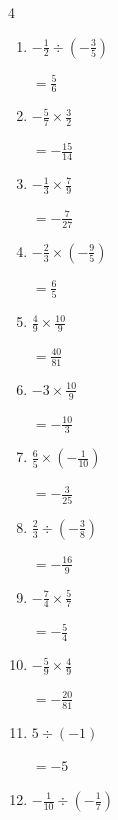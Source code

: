 \begin{multicols}{4}
\begin{enumerate}
        $\displaystyle =\frac{21}{2}$

  \item $\displaystyle -\frac{1}{2}\div{}\left(-\frac{3}{5}\right)$

        $\displaystyle =\frac{5}{6}$

  \item $\displaystyle -\frac{5}{7}\times{}\frac{3}{2}$

        $\displaystyle =-\frac{15}{14}$

\columnbreak %

  \item $\displaystyle -\frac{1}{3}\times{}\frac{7}{9}$

        $\displaystyle =-\frac{7}{27}$

  \item $\displaystyle -\frac{2}{3}\times{}\left(-\frac{9}{5}\right)$

        $\displaystyle =\frac{6}{5}$

  \item $\displaystyle \frac{4}{9}\times{}\frac{10}{9}$

        $\displaystyle =\frac{40}{81}$

  \item $\displaystyle -3\times{}\frac{10}{9}$

        $\displaystyle =-\frac{10}{3}$

  \item $\displaystyle \frac{6}{5}\times{}\left(-\frac{1}{10}\right)$

        $\displaystyle =-\frac{3}{25}$

  \item $\displaystyle \frac{2}{3}\div{}\left(-\frac{3}{8}\right)$

        $\displaystyle =-\frac{16}{9}$

  \item $\displaystyle -\frac{7}{4}\times{}\frac{5}{7}$

        $\displaystyle =-\frac{5}{4}$

  \item $\displaystyle -\frac{5}{9}\times{}\frac{4}{9}$

        $\displaystyle =-\frac{20}{81}$

  \item $\displaystyle 5\div{}\left(-1\right)$

        $\displaystyle =-5$

  \item $\displaystyle -\frac{1}{10}\div{}\left(-\frac{1}{7}\right)$


\end{enumerate}
\end{multicols}
